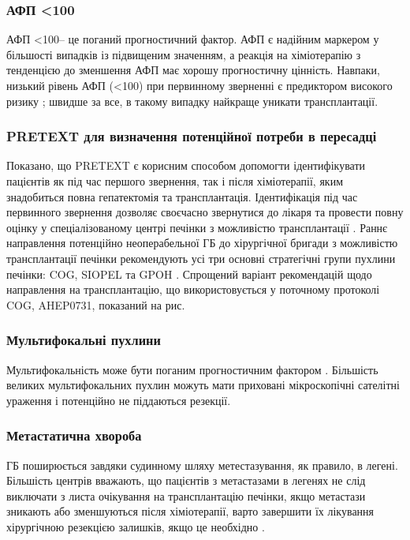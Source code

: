 \subsubsection{АФП <100} 
АФП <100– це поганий прогностичний фактор. АФП є надійним маркером у більшості випадків із підвищеним значенням, а реакція на хіміотерапію з тенденцією до зменшення АФП має хорошу прогностичну цінність. Навпаки, низький рівень АФП (<100) при первинному зверненні є предиктором високого ризику \cite{pmid1328586}; швидше за все, в такому випадку найкраще уникати трансплантації.

\subsubsection{PRETEXT для визначення потенційної потреби в пересадці} 
Показано, що PRETEXT є корисним способом допомогти ідентифікувати пацієнтів як під час першого звернення, так і після хіміотерапії, яким знадобиться повна гепатектомія та трансплантація. Ідентифікація під час первинного звернення дозволяє своєчасно звернутися до лікаря та провести повну оцінку у спеціалізованому центрі печінки з можливістю трансплантації \cite{pmid1323649}. Раннє направлення потенційно неоперабельної ГБ до хірургічної бригади з можливістю трансплантації печінки рекомендують усі три основні стратегічні групи пухлини печінки: COG, SIOPEL та GPOH \cite{pmid18970927}. Спрощений варіант рекомендацій щодо направлення на трансплантацію, що використовується у поточному протоколі COG, AHEP0731, показаний на рис.

\subsubsection{Мультифокальні пухлини} 
Мультифокальність може бути поганим прогностичним фактором \cite{pmid28126357}. Більшість великих мультифокальних пухлин можуть мати приховані мікроскопічні сателітні ураження і потенційно не піддаються резекції. 

\subsubsection{Метастатична хвороба} 
ГБ поширюється завдяки судинному шляху метестазування, як правило, в легені. Більшість центрів вважають, що пацієнтів з метастазами в легенях не слід виключати з листа очікування на трансплантацію печінки, якщо метастази зникають або зменшуються після хіміотерапії, варто завершити їх лікування хірургічною резекцією залишків, якщо це необхідно \cite{pmid22201955}.

